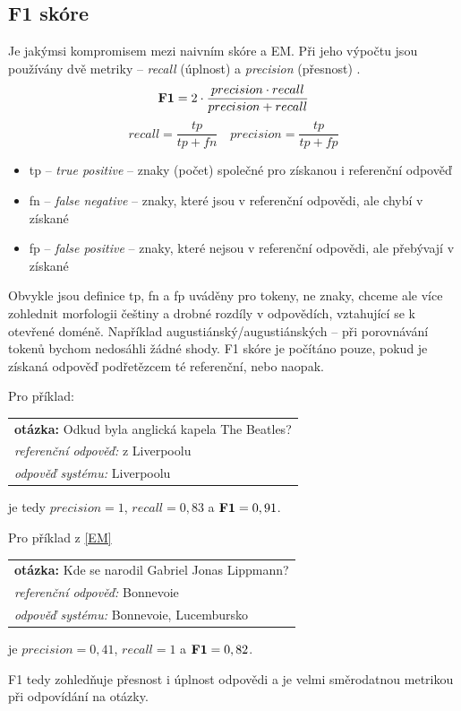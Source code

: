 \subsection{F1 skóre}
Je jakýmsi kompromisem mezi naivním skóre a EM. Při jeho výpočtu jsou používány dvě metriky -- \emph{recall} (úplnost) a \emph{precision} (přesnost) \cite{information_retrieval}.
\begin{equation}
    \text{\textbf{F1}} = 2\cdot \frac{precision \cdot recall}{precision + recall} 
\end{equation}
\begin{equation}
recall = \frac{tp}{tp+fn} \quad precision = \frac{tp}{tp+fp}
\end{equation}

\begin{itemize}
    \item tp -- \emph{true positive} -- znaky (počet) společné pro získanou i referenční odpověď
    \item fn -- \emph{false negative} -- znaky, které jsou v referenční odpovědi, ale chybí v získané
    \item fp -- \emph{false positive} -- znaky, které nejsou v referenční odpovědi, ale přebývají v získané
\end{itemize}

Obvykle jsou definice tp, fn a fp uváděny pro tokeny, ne znaky, chceme ale více zohlednit morfologii češtiny a drobné rozdíly v odpovědích, vztahující se k otevřené doméně. Například augustiánský/augustiánských -- při porovnávání tokenů bychom nedosáhli žádné shody. F1 skóre je počítáno pouze, pokud je získaná odpověď podřetězcem té referenční, nebo naopak.\par \medskip
\noindent Pro příklad: 
\begin{center}
\begin{tabular}{l}
    \textbf{otázka:} Odkud byla anglická kapela The Beatles?\\
    \emph{referenční odpověď:} z Liverpoolu\\
    \emph{odpověď systému:} Liverpoolu\\
\end{tabular}
\end{center}
je tedy $precision = 1$, $recall = 0,83$ a $\text{\textbf{F1}} = 0,91$.\par \medskip
\noindent Pro příklad z \ref{EM}
\begin{center}
\begin{tabular}{l}
    \textbf{otázka:} Kde se narodil Gabriel Jonas Lippmann?\\
    \emph{referenční odpověď:} Bonnevoie\\
    \emph{odpověď systému:} Bonnevoie, Lucembursko\\
\end{tabular}
\end{center}
je $precision = 0,41$, $recall = 1$ a $\text{\textbf{F1}} = 0,82$.\par \medskip
F1 tedy zohledňuje přesnost i úplnost odpovědi a je velmi směrodatnou metrikou při odpovídání na otázky.

